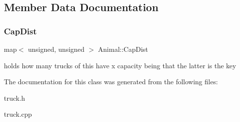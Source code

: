 \subsection{Member Data Documentation}
\mbox{\label{class_animal_a6109c3aa008a556ed43318ae4bcf33a2}} 
\subsubsection{\texorpdfstring{Cap\+Dist}{CapDist}}
{\footnotesize\ttfamily map$<$ unsigned, unsigned $>$ Animal\+::\+Cap\+Dist\hspace{0.3cm}{\ttfamily [static]}}

holds how many trucks of this have x capacity being that the latter is the key 

The documentation for this class was generated from the following files\+:\begin{DoxyCompactItemize}
\item 
truck.\+h\item 
truck.\+cpp\end{DoxyCompactItemize}
